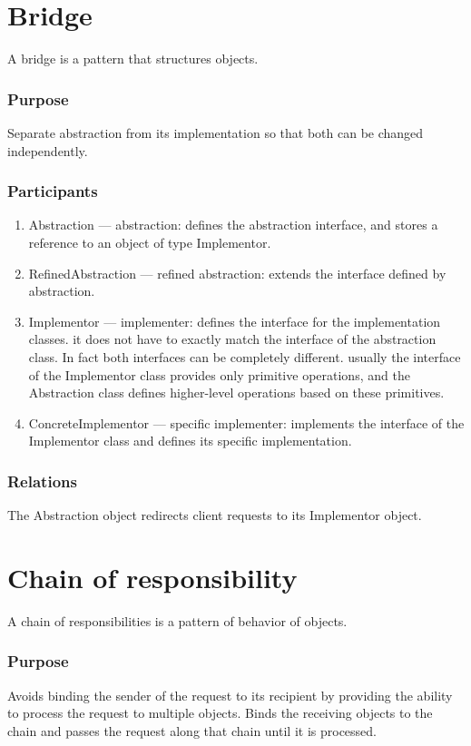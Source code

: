\documentclass[12pt]{book}
\begin{document}
\section{Bridge}
A bridge is a pattern that structures objects.

\subsubsection{Purpose}
Separate abstraction from its implementation so that both can be changed independently.

\subsubsection{Participants}
\begin{enumerate}
    \item Abstraction — abstraction: defines the abstraction interface, and stores a reference to an object of type Implementor.
    \item RefinedAbstraction —  refined abstraction: extends the interface defined by abstraction.
    \item Implementor — implementer: defines the interface for the implementation classes. it does not have to exactly match the interface of the abstraction class. In fact both interfaces can be completely different. usually the interface of the Implementor class provides only primitive operations, and the  Abstraction class defines higher-level operations based on these primitives.
    \item ConcreteImplementor —  specific implementer: implements the interface of the Implementor class and defines its specific implementation.
\end{enumerate}

\subsubsection{Relations}
The Abstraction object redirects client requests to its  Implementor object.

\section{Chain of responsibility}
A chain of responsibilities is a pattern of behavior of objects.

\subsubsection{Purpose}
Avoids binding the sender of the request to its recipient by providing the ability to process the request to multiple objects. Binds the receiving objects to the chain and passes the request along that chain until it is processed.
\end{document}
